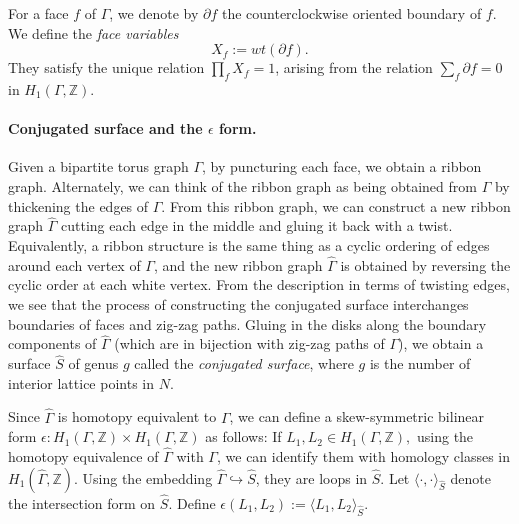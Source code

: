 \documentclass[11pt]{article} %
\theoremstyle{definition}
\newcommand{\Z}{{\mathbb Z}}
\begin{document}
For a face $f$ of $\Gamma$, we denote by $\partial f$ the counterclockwise oriented boundary of $f$. We define the \textit{face variables}
$$X_f:=wt(\partial f).$$  
They satisfy the unique relation $\prod_f X_f=1$, arising from the relation $\sum_f  \partial f =0$ in $H_1(\Gamma,\Z)$.

\paragraph{Conjugated surface and the $\epsilon$ form.} Given a bipartite torus graph $\Gamma$, by puncturing each face, we obtain a ribbon graph. Alternately, we can think of the ribbon graph as being obtained from $\Gamma$ by thickening the edges of $\Gamma$. From this ribbon graph, we can construct a new ribbon graph $\widehat \Gamma$ cutting each edge in the middle and gluing it back with a twist. Equivalently, a ribbon structure is the same thing as a cyclic ordering of edges around each vertex of $\Gamma$, and the new ribbon graph $\widehat \Gamma$ is obtained by reversing the cyclic order at each white vertex. From the description in terms of twisting edges, we see that the process of constructing the conjugated surface interchanges boundaries of faces and zig-zag paths. Gluing in the disks along the boundary components of $\widehat \Gamma$ (which are in bijection with zig-zag paths of $\Gamma$), we obtain a surface $\widehat S$ of genus $g$ called the \textit{conjugated surface}, where $g$ is the number of interior lattice points in $N$. 

Since $\widehat \Gamma $ is homotopy equivalent to $\Gamma$, we can define a skew-symmetric bilinear form $\epsilon :H_1(\Gamma,\Z) \times H_1(\Gamma,\Z)$ as follows: If $L_1,L_2 \in H_1(\Gamma,\Z),$ using the homotopy equivalence of $\widehat \Gamma$ with $\Gamma$, we can identify them with homology classes in $H_1(\widehat \Gamma,\Z)$. Using the embedding $\widehat \Gamma \hookrightarrow \widehat S$, they are loops in $\widehat S$. Let $\langle\cdot,\cdot\rangle_{\widehat S}$ denote the intersection form on $\widehat S$. Define $\epsilon(L_1,L_2):=\langle L_1, L_2 \rangle_{\widehat S}$.
\end{document}
